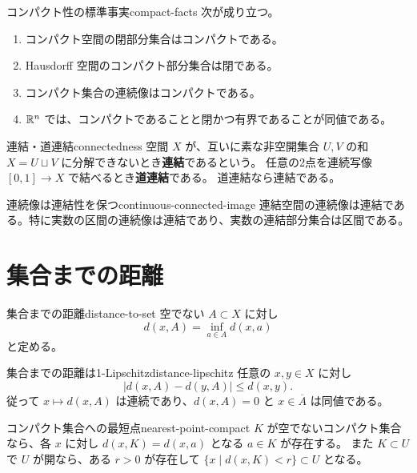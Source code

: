 \begin{theorem}{コンパクト性の標準事実}{compact-facts}
次が成り立つ。
\begin{enumerate}
  \item コンパクト空間の閉部分集合はコンパクトである。
  \item Hausdorff 空間のコンパクト部分集合は閉である。
  \item コンパクト集合の連続像はコンパクトである。
  \item $\mathbb{R}^n$ では、コンパクトであることと閉かつ有界であることが同値である。
\end{enumerate}
\end{theorem}

\begin{definition}{連結・道連結}{connectedness}
空間 $X$ が、互いに素な非空開集合 $U,V$ の和 $X=U\sqcup V$ に分解できないとき\textbf{連結}であるという。
任意の2点を連続写像 $[0,1]\to X$ で結べるとき\textbf{道連結}である。
道連結なら連結である。
\end{definition}

\begin{theorem}{連続像は連結性を保つ}{continuous-connected-image}
連結空間の連続像は連結である。特に実数の区間の連続像は連結であり、実数の連結部分集合は区間である。
\end{theorem}

\section{集合までの距離}

\begin{definition}{集合までの距離}{distance-to-set}
空でない $A\subset X$ に対し
\[
 d(x,A)=\inf_{a\in A}d(x,a)
\]
と定める。
\end{definition}

\begin{proposition}{集合までの距離は1-Lipschitz}{distance-lipschitz}
任意の $x,y\in X$ に対し
\[
  |d(x,A)-d(y,A)|\le d(x,y).
\]
従って $x\mapsto d(x,A)$ は連続であり、$d(x,A)=0$ と $x\in\overline A$ は同値である。
\end{proposition}

\begin{theorem}{コンパクト集合への最短点}{nearest-point-compact}
$K$ が空でないコンパクト集合なら、各 $x$ に対し $d(x,K)=d(x,a)$ となる $a\in K$ が存在する。
また $K\subset U$ で $U$ が開なら、ある $r>0$ が存在して $\{x\mid d(x,K)<r\}\subset U$ となる。
\end{theorem}

